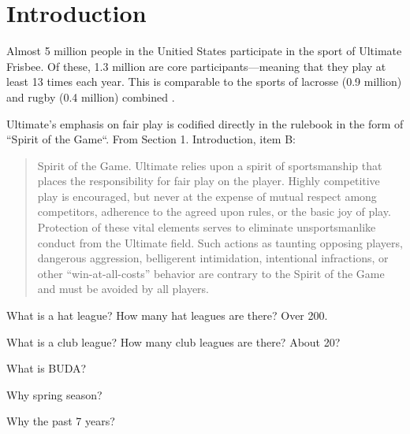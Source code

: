 \section{Introduction}

Almost 5 million people in the Unitied States participate in the sport of Ultimate Frisbee.  Of these, 1.3 million are core participants---meaning that they play at least 13 times each year.  This is comparable to the sports of lacrosse (0.9 million) and rugby (0.4 million) combined \cite{sfia_2016}.  

Ultimate's emphasis on fair play is codified directly in the rulebook in the form of ``Spirit of the Game``.  From Section 1. Introduction, item B:

\begin{quote} Spirit of the Game. Ultimate relies upon a spirit of sportsmanship that places the responsibility for fair play on the player. Highly competitive play is encouraged, but never at the expense of mutual respect among competitors, adherence to the agreed upon rules, or the basic joy of play. Protection of these vital elements serves to eliminate unsportsmanlike conduct from the Ultimate field. Such actions as taunting opposing players, dangerous aggression, belligerent intimidation, intentional infractions, or other ``win-at-all-costs'' behavior are contrary to the Spirit of the Game and must be avoided by all players.
\end{quote}

What is a hat league?  How many hat leagues are there? Over 200.

What is a club league?  How many club leagues are there? About 20?

What is BUDA?

Why spring season?

Why the past 7 years?